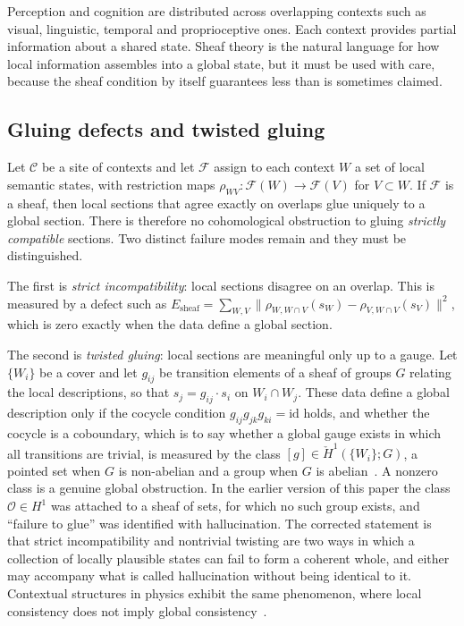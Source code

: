 \documentclass[11pt,a4paper]{article}
\theoremstyle{definition}
\theoremstyle{remark}
\begin{document}
Perception and cognition are distributed across overlapping contexts such
as visual, linguistic, temporal and proprioceptive ones. Each context
provides partial information about a shared state. Sheaf theory is the
natural language for how local information assembles into a global state,
but it must be used with care, because the sheaf condition by itself
guarantees less than is sometimes claimed.

\subsection{Gluing defects and twisted gluing}

Let $\mathcal{C}$ be a site of contexts and let $\mathcal{F}$ assign to each context
$W$ a set of local semantic states, with restriction maps
$\rho_{WV}:\mathcal{F}(W)\to\mathcal{F}(V)$ for $V\subset W$. If $\mathcal{F}$ is a sheaf, then local
sections that agree exactly on overlaps glue uniquely to a global section.
There is therefore no cohomological obstruction to gluing \emph{strictly
compatible} sections. Two distinct failure modes remain and they must be
distinguished.

The first is \emph{strict incompatibility}: local sections disagree on an
overlap. This is measured by a defect such as
$E_{\mathrm{sheaf}}=\sum_{W,V}\|\rho_{W,W\cap V}(s_W)-\rho_{V,W\cap V}(s_V)\|^2$,
which is zero exactly when the data define a global section.

The second is \emph{twisted gluing}: local sections are meaningful only up
to a gauge. Let $\{W_i\}$ be a cover and let $g_{ij}$ be transition elements
of a sheaf of groups $G$ relating the local descriptions, so that
$s_j=g_{ij}\cdot s_i$ on $W_i\cap W_j$. These data define a global
description only if the cocycle condition $g_{ij}g_{jk}g_{ki}=\mathrm{id}$
holds, and whether the cocycle is a coboundary, which is to say whether a
global gauge exists in which all transitions are trivial, is measured by the
class $[g]\in\check{H}^1(\{W_i\};G)$, a pointed set when $G$ is non-abelian
and a group when $G$ is abelian~\cite{maclane1992sheaves,robinson2014topological}.
A nonzero class is a genuine global obstruction. In the earlier version of
this paper the class $\mathcal{O}\in H^1$ was attached to a sheaf of
sets, for which no such group exists, and ``failure to glue'' was identified
with hallucination. The corrected statement is that strict incompatibility
and nontrivial twisting are two ways in which a collection of locally
plausible states can fail to form a coherent whole, and either may
accompany what is called hallucination without being identical to it.
Contextual structures in physics exhibit the same phenomenon, where local
consistency does not imply global consistency~\cite{abramsky2011sheaf}.
\end{document}
